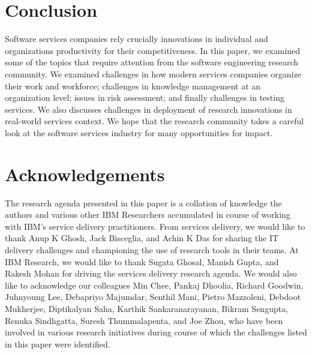 \documentclass{sig-alternate}
\begin{document}







%




\section{Conclusion}
\label{sec:conclusion}

Software services companies rely crucially innovations in individual and
organizations productivity for their competitiveness. In this paper, we examined
some of the topics that require attention from the software engineering research
community. We examined challenges in how modern services companies organize
their work and workforce; challenges in knowledge management at an organization
level; issues in risk assessment; and finally challenges in testing services. We
also discusses challenges in deployment of research innovations in real-world
services context. We hope that the research community takes a careful look at
the software services industry for many opportunities for impact.

\section*{Acknowledgements}
The research agenda presented in this paper is a collation of knowledge the
authors and various other IBM Researchers accumulated in course of working with
IBM's service delivery practitioners. From services delivery, we would like to
thank Anup K Ghosh, Jack Bisceglia, and Achin K Das for sharing the IT delivery
challenges and championing the use of research tools in their teams. At IBM
Research, we would like to thank Sugata Ghosal, Manish Gupta, and Rakesh Mohan
for driving the services delivery research agenda. We would also like to
acknowledge our colleagues Min Chee, Pankaj Dhoolia, Richard Goodwin, Juhnyoung
Lee, Debapriyo Majumdar, Senthil Mani, Pietro Mazzoleni, Debdoot Muk\-herjee,
Diptikalyan Saha, Karthik Sankaranarayanan, Bikram Sengupta, Renuka Sindhgatta,
Suresh Thummalapenta, and Joe Zhou, who have been involved in various research
initiatives during course of which the challenges listed in this paper were
identified.


{\small

}
\end{document}
